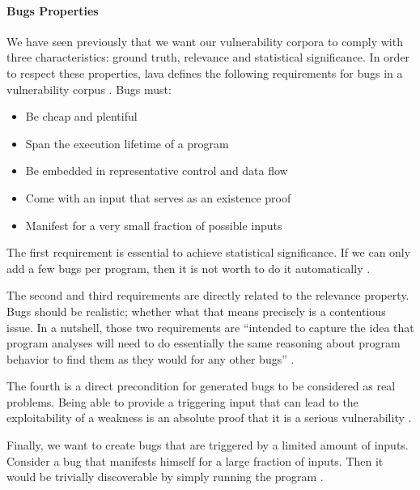 \paragraph{Bugs Properties}We have seen previously that we want our vulnerability corpora to comply with three characteristics: ground truth, relevance and statistical significance. In order to respect these properties, \gls{lava} defines the following requirements for bugs in a vulnerability corpus \cite{dolan2016lava}. Bugs must:

\begin{itemize}
    \item[\textcolor{custom-green}{\ding{51}}] Be cheap and plentiful
    \item[\textcolor{custom-green}{\ding{51}}] Span the execution lifetime of a program
    \item[\textcolor{custom-green}{\ding{51}}] Be embedded in representative control and data flow
    \item[\textcolor{custom-green}{\ding{51}}] Come with an input that serves as an existence proof
    \item[\textcolor{custom-green}{\ding{51}}] Manifest for a very small fraction of possible inputs
\end{itemize}

The first requirement is essential to achieve statistical significance. If we can only add a few bugs per program, then it is not worth to do it automatically \cite{dolan2016lava}.

The second and third requirements are directly related to the relevance property. Bugs should be realistic; whether what that means precisely is a contentious issue. In a nutshell, those two requirements are ``intended to capture the idea that program analyses will need to do essentially the same reasoning about program behavior to find them as they would for any other bugs'' \cite{dolan2016million}.

The fourth is a direct precondition for generated bugs to be considered as real problems. Being able to provide a triggering input that can lead to the exploitability of a weakness is an absolute proof that it is a serious vulnerability \cite{dolan2016lava, dolan2016million}.

Finally, we want to create bugs that are triggered by a limited amount of inputs. Consider a bug that manifests himself for a large fraction of inputs. Then it would be trivially discoverable by simply running the program \cite{dolan2016lava,dolan2016million,dolan2016mechanics}.

